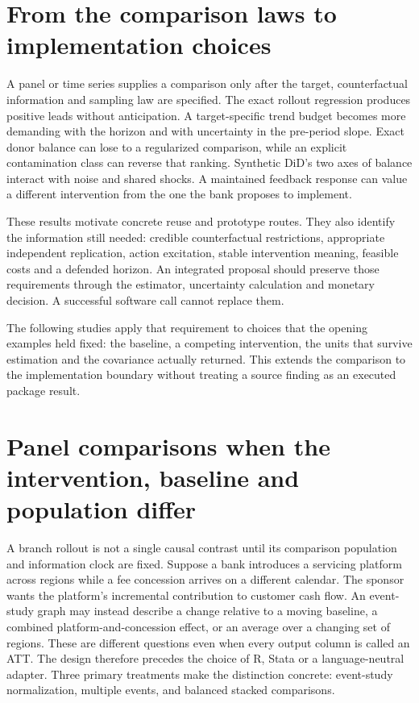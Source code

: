 

\section{From the comparison laws to implementation choices}
\label{exec17:s6-end}

A panel or time series supplies a comparison only after the target,
counterfactual information and sampling law are specified. The exact
rollout regression produces positive leads without anticipation.
A target-specific trend budget becomes more demanding with the
horizon and with uncertainty in the pre-period slope. Exact donor
balance can lose to a regularized comparison, while an explicit
contamination class can reverse that ranking. Synthetic DiD's two
axes of balance interact with noise and shared shocks. A maintained
feedback response can value a different intervention from the one
the bank proposes to implement.

These results motivate concrete reuse and prototype routes. They
also identify the information still needed: credible counterfactual
restrictions, appropriate independent replication, action excitation,
stable intervention meaning, feasible costs and a defended horizon.
An integrated proposal should preserve those requirements through
the estimator, uncertainty calculation and monetary decision. A
successful software call cannot replace them.

The following studies apply that requirement to choices that the opening
examples held fixed: the baseline, a competing intervention, the units that
survive estimation and the covariance actually returned. This extends the
comparison to the implementation boundary without treating a source finding
as an executed package result.


\section{Panel comparisons when the intervention, baseline and population differ}
\label{sec:exec28-panel-designs}

A branch rollout is not a single causal contrast until its comparison population and information clock are fixed.
Suppose a bank introduces a servicing platform across regions while a fee concession arrives on a different calendar.
The sponsor wants the platform's incremental contribution to customer cash flow. An event-study graph may instead describe
a change relative to a moving baseline, a combined platform-and-concession effect, or an average over a changing set of regions.
These are different questions even when every output column is called an ATT. The design therefore precedes the choice of R,
Stata or a language-neutral adapter. Three primary treatments make the distinction concrete: event-study normalization,
multiple events, and balanced stacked comparisons.~\citep{exec28_panel_roth,exec28_panel_tsai,exec28_panel_wing}

